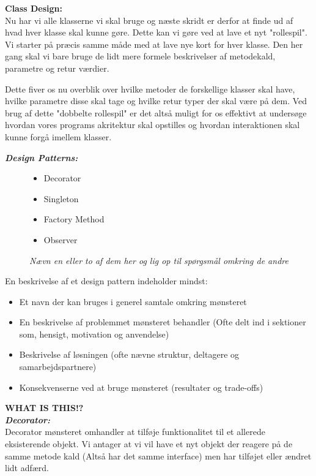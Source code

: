 \documentclass[a4paper,12pt]{article}
\newcommand{\textbfit}[1]{\textbf{\textit{#1}}}
\begin{document}
\textbf{Class Design:} \\
Nu har vi alle klasserne vi skal bruge og næste skridt er derfor at finde ud af hvad hver klasse skal kunne gøre. Dette kan vi gøre ved at lave et nyt "rollespil". Vi starter på præcis samme måde med at lave nye kort for hver klasse. Den her gang skal vi bare bruge de lidt mere formele beskrivelser af metodekald, parametre og retur værdier.

Dette fiver os nu overblik over hvilke metoder de forskellige klasser skal have, hvilke parametre disse skal tage og hvilke retur typer der skal være på dem. Ved brug af dette "dobbelte rollespil" er det altså muligt for os effektivt at undersøge hvordan vores programs akritektur skal opstilles og hvordan interaktionen skal kunne forgå imellem klasser.

\textbfit{Design Patterns: }\\
\begin{figure}[h]
    \begin{itemize}
        \item Decorator
        \item Singleton
        \item Factory Method
        \item Observer
    \end{itemize}
    \caption*{\textit{Nævn en eller to af dem her og lig op til spørgsmål omkring de andre}}
\end{figure}

En beskrivelse af et design pattern indeholder mindst:
\begin{itemize}
    \item Et navn der kan bruges i generel samtale omkring mønsteret
    \item En beskrivelse af problemmet mønsteret behandler (Ofte delt ind i sektioner som, hensigt, motivation og anvendelse)
    \item Beskrivelse af løsningen (ofte nævne struktur, deltagere og samarbejdspartnere)
    \item Konsekvenserne ved at bruge mønsteret (resultater og trade-offs)
\end{itemize}

\textbf{\fontsize{100pt}{10pt}\selectfont WHAT IS THIS!?}\\

\textbfit{Decorator: } \\
Decorator mønsteret omhandler at tilføje funktionalitet til et allerede eksisterende objekt. Vi antager at vi vil have et nyt objekt der reagere på de samme metode kald (Altså har det samme interface) men har tilføjet eller ændret lidt adfærd.
\end{document}
